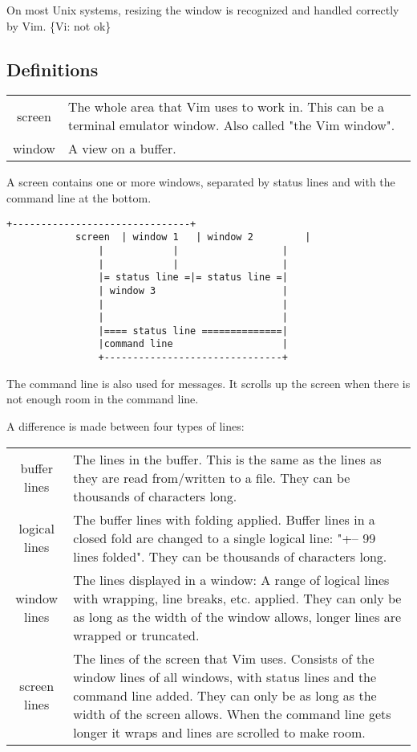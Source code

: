 On most Unix systems, resizing the window is recognized and handled correctly by Vim.
\{Vi: not ok\}

\subsection{Definitions}
\label{definitions}
\begin{tabularx}{\textwidth}{c X}
				screen & The whole area that Vim uses to work in.
				This can be a terminal emulator window.
				Also called "the Vim window". \\
				window & A view on a buffer.
\end{tabularx}

A screen contains one or more windows, separated by status lines and with the command line at the bottom.

\begin{Verbatim}[samepage=true] 
				+-------------------------------+
			screen  | window 1   | window 2         |
				|            |                  |
				|            |                  |
				|= status line =|= status line =|
				| window 3                      |
				|                               |
				|                               |
				|==== status line ==============|
				|command line                   |
				+-------------------------------+
\end{Verbatim}

The command line is also used for messages.
It scrolls up the screen when there is not enough room in the command line.

A difference is made between four types of lines:

\begin{center}
				\begin{tabularx}{\textwidth}{c X}
								buffer lines & 
								The lines in the buffer.
								This is the same as the lines as they are read from/written to a file.
								They can be thousands of characters long. \\

								logical lines & 
								The buffer lines with folding applied.
								Buffer lines in a closed fold are changed to a single logical line: "+-- 99 lines folded".
								They can be thousands of characters long.\\

								window lines & 
								The lines displayed in a window: A range of logical lines with wrapping, line breaks, etc.  applied.
								They can only be as long as the width of the window allows, longer lines are wrapped or truncated.\\

								screen lines & 
								The lines of the screen that Vim uses.
								Consists of the window lines of all windows, with status lines and the command line added.
								They can only be as long as the width of the screen allows.
								When the command line gets longer it wraps and lines are scrolled to make room.
				\end{tabularx}
\end{center}

